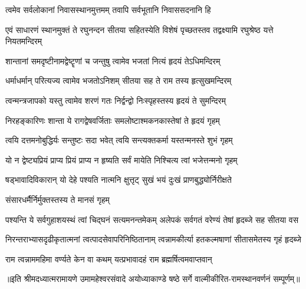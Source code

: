 
\addtocounter{shlokacount}{51}


\twolineshloka
{त्वमेव सर्वलोकानां निवासस्थानमुत्तमम्}
{तवापि सर्वभूतानि निवाससदनानि हि} %

\threelineshloka
{एवं साधारणं स्थानमुक्तं ते रघुनन्दन}
{सीतया सहितस्येति विशेषं पृच्छतस्तव}
{तद्वक्ष्यामि रघुश्रेष्ठ यत्ते नियतमन्दिरम्} %

\twolineshloka
{शान्तानां समदृष्टीनामद्वेष्टॄणां च जन्तुषु}
{त्वामेव भजतां नित्यं हृदयं तेऽधिमन्दिरम्} %

\twolineshloka
{धर्माधर्मान् परित्यज्य त्वामेव भजतोऽनिशम्}
{सीतया सह ते राम तस्य हृत्सुखमन्दिरम्} %

\twolineshloka
{त्वन्मन्त्रजापको यस्तु त्वामेव शरणं गतः}
{निर्द्वन्द्वो निःस्पृहस्तस्य हृदयं ते सुमन्दिरम्} %

\twolineshloka
{निरहङ्कारिणः शान्ता ये रागद्वेषवर्जिताः}
{समलोष्टाश्मकनकास्तेषां ते हृदयं गृहम्} %

\twolineshloka
{त्वयि दत्तमनोबुद्धिर्यः सन्तुष्टः सदा भवेत्}
{त्वयि सन्त्यक्तकर्मा यस्तन्मनस्ते शुभं गृहम्} %

\twolineshloka
{यो न द्वेष्ट्यप्रियं प्राप्य प्रियं प्राप्य न हृष्यति}
{सर्वं मायेति निश्चित्य त्वां भजेत्तन्मनो गृहम्} %

\twolineshloka
{षड्भावादिविकारान् यो देहे पश्यति नात्मनि}
{क्षुत्तृट् सुखं भयं दुःखं प्राणबुद्ध्योर्निरीक्षते} %

\onelineshloka
{संसारधर्मैर्निर्मुक्तस्तस्य ते मानसं गृहम्} %

\fourlineindentedshloka
{पश्यन्ति ये सर्वगुहाशयस्थं}
{त्वां चिद्घनं सत्यमनन्तमेकम्}
{अलेपकं सर्वगतं वरेण्यं}
{तेषां हृदब्जे सह सीतया वस} %

\fourlineindentedshloka
{निरन्तराभ्यासदृढीकृतात्मनां}
{त्वत्पादसेवापरिनिष्ठितानाम्}
{त्वन्नामकीर्त्या हतकल्मषाणां}
{सीतासमेतस्य गृहं हृदब्जे} %

\twolineshloka
{राम त्वन्नाममहिमा वर्ण्यते केन वा कथम्}
{यत्प्रभावादहं राम ब्रह्मर्षित्वमवाप्तवान्} %

{॥इति श्रीमदध्यात्मरामायणे उमामहेश्वरसंवादे
अयोध्याकाण्डे षष्ठे सर्गे  वाल्मीकीरित-रामस्थानवर्णनं  सम्पूर्णम्॥}
